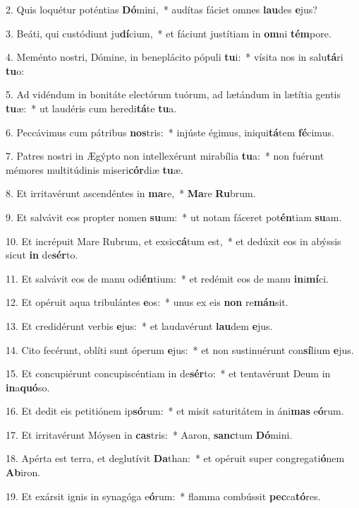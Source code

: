 2. Quis loquétur poténtias \textbf{Dó}mini,~*  audítas fáciet omnes \textbf{lau}des \textbf{e}jus?\

3. Beáti, qui custódiunt ju\textbf{dí}cium,~*  et fáciunt justítiam in \textbf{om}ni \textbf{tém}pore.\

4. Meménto nostri, Dómine, in beneplácito pópuli \textbf{tu}i:~*  vísita nos in salu\textbf{tá}ri \textbf{tu}o:\

5. Ad vidéndum in bonitáte electórum tuórum, ad lætándum in lætítia gentis \textbf{tu}æ:~*  ut laudéris cum heredi\textbf{tá}te \textbf{tu}a.\

6. Peccávimus cum pátribus \textbf{nos}tris:~*  injúste égimus, iniqui\textbf{tá}tem \textbf{fé}cimus.\

7. Patres nostri in Ægýpto non intellexérunt mirabília \textbf{tu}a:~*  non fuérunt mémores multitúdinis miseri\textbf{cór}diæ \textbf{tu}æ.\

8. Et irritavérunt ascendéntes in \textbf{ma}re,~*  \textbf{Ma}re \textbf{Ru}brum.\

9. Et salvávit eos propter nomen \textbf{su}um:~*  ut notam fáceret pot\textbf{én}tiam \textbf{su}am.\

10. Et incrépuit Mare Rubrum, et exsic\textbf{cá}tum est,~*  et dedúxit eos in abýssis sicut \textbf{in} de\textbf{sér}to.\

11. Et salvávit eos de manu odi\textbf{én}tium:~*  et redémit eos de manu \textbf{in}i\textbf{mí}ci.\

12. Et opéruit aqua tribulántes \textbf{e}os:~*  unus ex eis \textbf{non} re\textbf{mán}sit.\

13. Et credidérunt verbis \textbf{e}jus:~*  et laudavérunt \textbf{lau}dem \textbf{e}jus.\

14. Cito fecérunt, oblíti sunt óperum \textbf{e}jus:~*  et non sustinuérunt con\textbf{sí}lium \textbf{e}jus.\

15. Et concupiérunt concupiscéntiam in de\textbf{sér}to:~*  et tentavérunt Deum in \textbf{in}a\textbf{quó}so.\

16. Et dedit eis petitiónem ip\textbf{só}rum:~*  et misit saturitátem in áni\textbf{mas} e\textbf{ó}rum.\

17. Et irritavérunt Móysen in \textbf{cas}tris:~*  Aaron, \textbf{sanc}tum \textbf{Dó}mini.\

18. Apérta est terra, et deglutívit \textbf{Da}than:~*  et opéruit super congregati\textbf{ó}nem \textbf{Ab}iron.\

19. Et exársit ignis in synagóga e\textbf{ó}rum:~*  flamma combússit \textbf{pec}ca\textbf{tó}res.\

